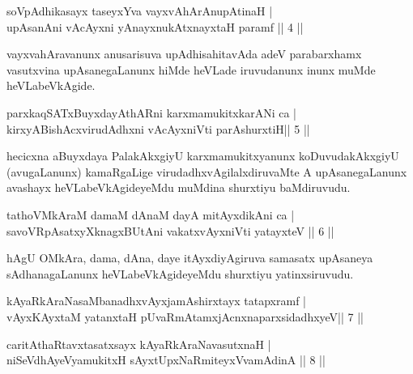 \begin{shl}
soVpAdhikasayx taseyxYva vayxvAhArAnupAtinaH |\\
upAsanAni vAcAyxni yAnayxnukAtxnayxtaH paramf \hfill||  4 ||  
\end{shl}

\begin{artha}
vayxvahAravanunx anusarisuva upAdhisahitavAda adeV parabarxhamx vasutxvina upAsanegaLanunx hiMde heVLade iruvudanunx inunx muMde heVLabeVkAgide.
\end{artha}


\begin{shl}
parxkaqSATxBuyxdayAthARni karxmamukitxkarANi ca  | \\
kirxyABishAcxvirudAdhxni vAcAyxniVti parAshurxtiH\hfill||  5  ||  
\end{shl}

\begin{artha}
hecicxna aBuyxdaya PalakAkxgiyU karxmamukitxyanunx koDuvudakAkxgiyU (avugaLanunx) kamaRgaLige virudadhxvAgilalxdiruvaMte A upAsanegaLanunx avashayx heVLabeVkAgideyeMdu muMdina shurxtiyu baMdiruvudu.
\end{artha}



\begin{shl}
tathoVMkAraM damaM dAnaM dayA mitAyxdikAni ca  | \\
savoVRpAsatxyXknagxBUtAni vakatxvAyxniVti yatayxteV \hfill||  6 ||   
\end{shl}

\begin{artha}
hAgU OMkAra, dama, dAna, daye itAyxdiyAgiruva samasatx upAsaneya sAdhanagaLanunx heVLabeVkAgideyeMdu shurxtiyu yatinxsiruvudu.
\end{artha}


\begin{shl}
kAyaRkAraNasaMbanadhxvAyxjamAshirxtayx tatapxramf  | \\
vAyxKAyxtaM yatanxtaH pUvaRmAtamxjAcnxnaparxsidadhxyeV\hfill ||  7 ||  
\end{shl}

\begin{shl}
caritAthaRtavxtasatxsayx kAyaRkAraNavasutxnaH  | \\
niSeVdhAyeVyamukitxH sAyxtUpxNaRmiteyxVvamAdinA \hfill||  8 ||  
\end{shl}

